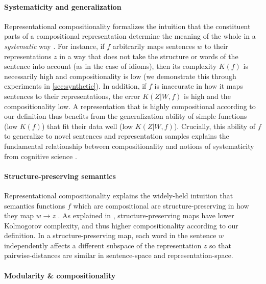 \documentclass{article}
\newcommand{\Comp}{Representational compositionality}
\begin{document}
\paragraph{Systematicity and generalization}

\Comp{} formalizes the intuition that the constituent parts of a compositional representation determine the meaning of the whole in a \emph{systematic} way \citep{sep-compositionality,gendler2012case}. For instance, if $f$ arbitrarily maps sentences $w$ to their representations $z$ in a way that does not take the structure or words of the sentence into account (as in the case of idioms), then its complexity $K(f)$ is necessarily high and compositionality is low (we demonstrate this through experiments in \cref{sec:synthetic}). In addition, if $f$ is inaccurate in how it maps sentences to their representations, the error $K(Z|W,f)$ is high and the compositionality low. A representation that is highly compositional according to our definition thus benefits from the generalization ability of simple functions (low $K(f)$) that fit their data well (low $K(Z|W,f)$). Crucially, this ability of $f$ to generalize to novel sentences and representation samples explains the fundamental relationship between compositionality and notions of systematicity from cognitive science \citep{sep-compositionality}.

\paragraph{Structure-preserving semantics}

\Comp{} explains the widely-held intuition that semantics functions $f$ which are compositional are structure-preserving in how they map $w \rightarrow z$ \citep{montague1970english}. As explained in \citet{ren2023improving}, structure-preserving maps have lower Kolmogorov complexity, and thus higher compositionality according to our definition. In a structure-preserving map, each word in the sentence $w$ independently affects a different subspace of the representation $z$ so that pairwise-distances are similar in sentence-space and representation-space. 

\paragraph{Modularity \& compositionality}
\end{document}
